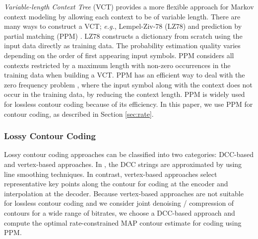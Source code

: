 \textit{Variable-length Context Tree} (VCT) \cite{rissanen1983universal,begleiter2004prediction} provides a more flexible approach for Markov context modeling by allowing each context to be of variable length. 
There are many ways to construct a VCT; \textit{e.g.}, Lempel-Ziv-78 (LZ78) \cite{ziv1977universal} and prediction by partial matching (PPM) \cite{cleary1984data,moffat1990implementing}.
LZ78 constructs a dictionary from scratch using the input data directly as training data. 
The probability estimation quality varies depending on the order of first appearing input symbols.
PPM considers all contexts restricted by a maximum length with non-zero occurrences in the training data when building a VCT.
PPM has an efficient way to deal with the zero frequency problem \cite{begleiter2004prediction}, where the input symbol along with the context does not occur in the training data, by reducing the context length. 
PPM is widely used for lossless contour coding \cite{egger1996region,jordan1998shape} because of its efficiency.
In this paper, we use PPM for contour coding, as described in Section \ref{sec:rate}.

\subsubsection{Lossy Contour Coding}
\label{subsubsec:related_lossy}

Lossy contour coding approaches can be classified into two categories: DCC-based \cite{zahir2007new,yuan2015contour} and vertex-based \cite{katsaggelos1998mpeg,sohel2007new,lai2010arbitrary} approaches. 
In \cite{zahir2007new,yuan2015contour}, the DCC strings are approximated by using line smoothing techniques. 
In contrast, vertex-based approaches select representative key points along the contour for coding at the encoder and interpolation at the decoder.
Because vertex-based approaches are not suitable for lossless contour coding and we consider joint denoising / compression of contours for a wide range of bitrates, 
we choose a DCC-based approach and compute the optimal rate-constrained MAP contour estimate for coding using PPM.

